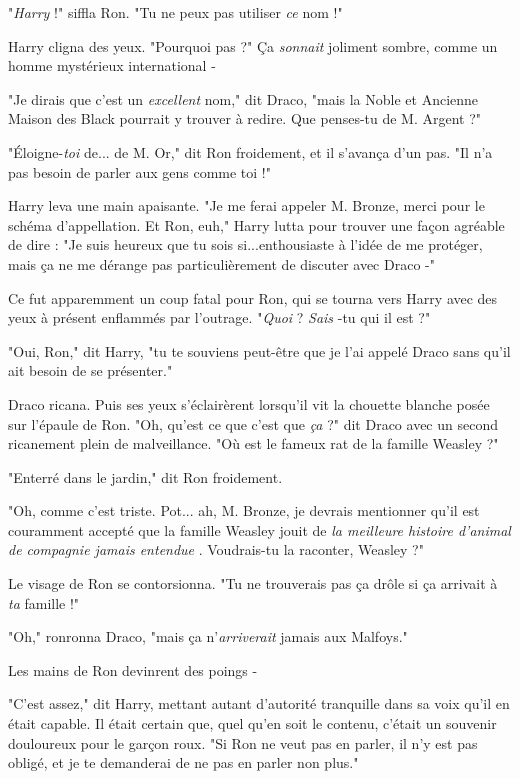 "\emph{Harry}  !" siffla Ron. "Tu ne peux pas utiliser \emph{ce}  nom !"

Harry cligna des yeux. "Pourquoi pas ?" Ça \emph{sonnait}  joliment sombre, comme un homme mystérieux international -

"Je dirais que c'est un \emph{excellent}  nom," dit Draco, "mais la Noble et Ancienne Maison des Black pourrait y trouver à redire. Que penses-tu de M. Argent ?"

"Éloigne-\emph{toi}  de... de M. Or," dit Ron froidement, et il s'avança d'un pas. "Il n'a pas besoin de parler aux gens comme toi !"

Harry leva une main apaisante. "Je me ferai appeler M. Bronze, merci pour le schéma d'appellation. Et Ron, euh," Harry lutta pour trouver une façon agréable de dire : "Je suis heureux que tu sois si...enthousiaste à l'idée de me protéger, mais ça ne me dérange pas particulièrement de discuter avec Draco -"

Ce fut apparemment un coup fatal pour Ron, qui se tourna vers Harry avec des yeux à présent enflammés par l'outrage. "\emph{Quoi}  ? \emph{Sais} -tu qui il est ?"

"Oui, Ron," dit Harry, "tu te souviens peut-être que je l'ai appelé Draco sans qu'il ait besoin de se présenter."

Draco ricana. Puis ses yeux s'éclairèrent lorsqu'il vit la chouette blanche posée sur l'épaule de Ron. "Oh, qu'est ce que c'est que \emph{ça}  ?" dit Draco avec un second ricanement plein de malveillance. "Où est le fameux rat de la famille Weasley ?"

"Enterré dans le jardin," dit Ron froidement.

"Oh, comme c'est triste. Pot... ah, M. Bronze, je devrais mentionner qu'il est couramment accepté que la famille Weasley jouit de \emph{la meilleure histoire d'animal de compagnie jamais entendue} . Voudrais-tu la raconter, Weasley ?"

Le visage de Ron se contorsionna. "Tu ne trouverais pas ça drôle si ça arrivait à \emph{ta}  famille !"

"Oh," ronronna Draco, "mais ça n'\emph{arriverait}  jamais aux Malfoys."

Les mains de Ron devinrent des poings -

"C'est assez," dit Harry, mettant autant d'autorité tranquille dans sa voix qu'il en était capable. Il était certain que, quel qu'en soit le contenu, c'était un souvenir douloureux pour le garçon roux. "Si Ron ne veut pas en parler, il n'y est pas obligé, et je te demanderai de ne pas en parler non plus."

